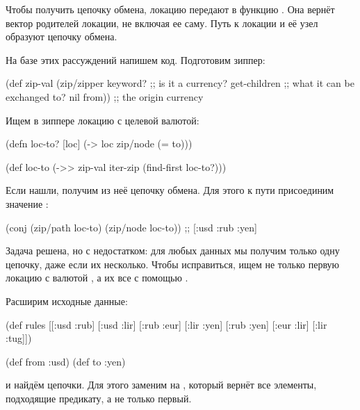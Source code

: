 Чтобы получить цепочку обмена, локацию  передают в функцию . Она
вернёт вектор родителей локации, не включая ее саму. Путь к локации и её узел
образуют цепочку обмена.

На базе этих рассуждений напишем код. Подготовим зиппер:

\begin{english}
  \begin{clojure}
(def zip-val
  (zip/zipper keyword?      ;; is it a currency?
              get-children  ;; what it can be exchanged to?
              nil
              from))        ;; the origin currency
  \end{clojure}
\end{english}

Ищем в зиппере локацию с целевой валютой:

\begin{english}
  \begin{clojure}
(defn loc-to? [loc]
  (-> loc zip/node (= to)))

(def loc-to
  (->> zip-val
       iter-zip
       (find-first loc-to?)))
  \end{clojure}
\end{english}

Если нашли, получим из неё цепочку обмена. Для этого к пути присоединим значение
:

\begin{english}
  \begin{clojure}
(conj (zip/path loc-to) (zip/node loc-to))
;; [:usd :rub :yen]
  \end{clojure}
\end{english}

Задача решена, но с недостатком: для любых данных мы получим только одну
цепочку, даже если их несколько. Чтобы исправиться, ищем не только первую
локацию с валютой , а их все с помощью .

Расширим исходные данные:

\begin{english}
  \begin{clojure}
(def rules
  [[:usd :rub]
   [:usd :lir]
   [:rub :eur]
   [:lir :yen]
   [:rub :yen]
   [:eur :lir]
   [:lir :tug]])

(def from :usd)
(def to :yen)
  \end{clojure}
\end{english}

и найдём цепочки. Для этого заменим  на , который вернёт все
элементы, подходящие предикату, а не только первый.

